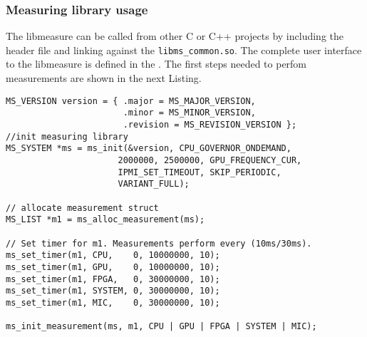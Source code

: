 \subsubsection{Measuring library usage}
\label{sec:libmeasureUsage}

The libmeasure can be called from other C or C++ projects by including the header file  and linking against the \texttt{libms\_common.so}. The complete user interface to the libmeasure is defined in the .
The first steps needed to perfom measurements are shown in the next Listing.

\begin{lstlisting}[caption={Initialization of our measuring library \texttt{libmeasure}. Each function name has a \texttt{ms\_} prefix.\added[id=ck]{Listing an neue structs und IPMI enum angepasst}},label=lst:InitMS]
MS_VERSION version = { .major = MS_MAJOR_VERSION,
					   .minor = MS_MINOR_VERSION,
					   .revision = MS_REVISION_VERSION };
//init measuring library
MS_SYSTEM *ms = ms_init(&version, CPU_GOVERNOR_ONDEMAND,
                      2000000, 2500000, GPU_FREQUENCY_CUR, 
                      IPMI_SET_TIMEOUT, SKIP_PERIODIC,
                      VARIANT_FULL);
	
// allocate measurement struct
MS_LIST *m1 = ms_alloc_measurement(ms);
	
// Set timer for m1. Measurements perform every (10ms/30ms).
ms_set_timer(m1, CPU,    0, 10000000, 10);
ms_set_timer(m1, GPU,    0, 10000000, 10);
ms_set_timer(m1, FPGA,   0, 30000000, 10);
ms_set_timer(m1, SYSTEM, 0, 30000000, 10);
ms_set_timer(m1, MIC,    0, 30000000, 10);

ms_init_measurement(ms, m1, CPU | GPU | FPGA | SYSTEM | MIC);
\end{lstlisting}

